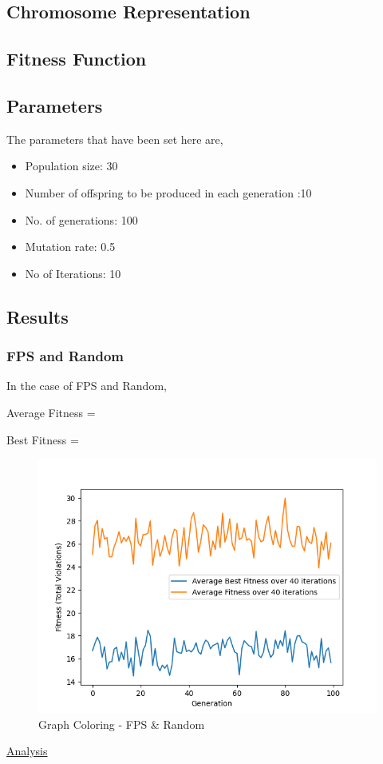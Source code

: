 \documentclass[11pt, letterpaper]{article}
\begin{document}
\subsection {Chromosome Representation}
\subsection {Fitness Function}
\subsection {Parameters}
The parameters that have been set here are,
\begin{itemize}
    \item Population size: 30
    \item Number of offspring to be produced in each generation :10
    \item No. of generations: 100
    \item Mutation rate: 0.5
    \item No of Iterations: 10
\end{itemize}
\subsection {Results} 
\subsubsection {FPS and Random}
In the case of FPS and Random,

Average Fitness = 

Best Fitness = 
\begin{figure}[H]
    \centering
    \includegraphics[scale = 0.6]{images/graphcoloring_fp_rd.png}
    \caption {Graph Coloring - FPS \& Random}
    \label {fig:gcFR}
\end{figure}
\underline{Analysis}
\end{document}
